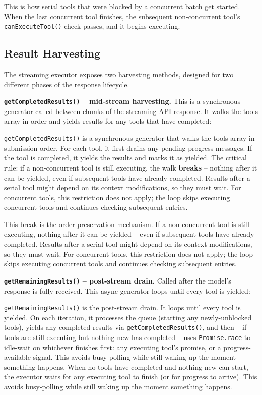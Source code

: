 \documentclass[
  english,
  11pt,
  letterpaper,
]{book}
\begin{document}
This is how serial tools that were blocked by a concurrent batch get
started. When the last concurrent tool finishes, the subsequent
non-concurrent tool's \texttt{canExecuteTool()} check passes, and it
begins executing.

\subsection{Result Harvesting}\label{result-harvesting}

The streaming executor exposes two harvesting methods, designed for two
different phases of the response lifecycle.

\textbf{\texttt{getCompletedResults()} -- mid-stream harvesting.} This
is a synchronous generator called between chunks of the streaming API
response. It walks the tools array in order and yields results for any
tools that have completed:

\texttt{getCompletedResults()} is a synchronous generator that walks the
tools array in submission order. For each tool, it first drains any
pending progress messages. If the tool is completed, it yields the
results and marks it as yielded. The critical rule: if a non-concurrent
tool is still executing, the walk \textbf{breaks} -- nothing after it
can be yielded, even if subsequent tools have already completed. Results
after a serial tool might depend on its context modifications, so they
must wait. For concurrent tools, this restriction does not apply; the
loop skips executing concurrent tools and continues checking subsequent
entries.

This break is the order-preservation mechanism. If a non-concurrent tool
is still executing, nothing after it can be yielded -- even if
subsequent tools have already completed. Results after a serial tool
might depend on its context modifications, so they must wait. For
concurrent tools, this restriction does not apply; the loop skips
executing concurrent tools and continues checking subsequent entries.

\textbf{\texttt{getRemainingResults()} -- post-stream drain.} Called
after the model's response is fully received. This async generator loops
until every tool is yielded:

\texttt{getRemainingResults()} is the post-stream drain. It loops until
every tool is yielded. On each iteration, it processes the queue
(starting any newly-unblocked tools), yields any completed results via
\texttt{getCompletedResults()}, and then -- if tools are still executing
but nothing new has completed -- uses \texttt{Promise.race} to idle-wait
on whichever finishes first: any executing tool's promise, or a
progress-available signal. This avoids busy-polling while still waking
up the moment something happens. When no tools have completed and
nothing new can start, the executor waits for any executing tool to
finish (or for progress to arrive). This avoids busy-polling while still
waking up the moment something happens.
\end{document}
